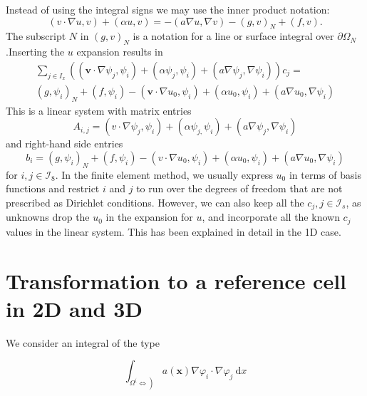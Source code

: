 \documentclass[../main.tex]{subfiles}
\begin{document}
	Instead of using the integral signs we may use the inner product notation:
	$$
	(v \cdot \nabla u, v)+(\alpha u, v)=-(a \nabla u, \nabla v)-(g, v)_{N}+(f, v) .
	$$
	The subscript $N$ in $(g, v)_{N}$ is a notation for a line or surface integral over $\partial \Omega_{N}$.\smallbreak Inserting the $u$ expansion results in
	$$
	\begin{aligned}
		\sum_{j \in I_{x}}\left(\left(\boldsymbol{v} \cdot \nabla \psi_{j}, \psi_{i}\right)+\left(\alpha \psi_{j}, \psi_{i}\right)+\left(a \nabla \psi_{j}, \nabla \psi_{i}\right)\right) c_{j}=\\
		\left(g, \psi_{i}\right)_{N}+\left(f, \psi_{i}\right)-\left(\boldsymbol{v} \cdot \nabla u_{0}, \psi_{i}\right)+\left(\alpha u_{0}, \psi_{i}\right)+\left(a \nabla u_{0}, \nabla \psi_{i}\right)
	\end{aligned}
	$$
	This is a linear system with matrix entries
	$$
	A_{i, j}=\left(v \cdot \nabla \psi_{j}, \psi_{i}\right)+\left(\alpha \psi_{j,} \psi_{i}\right)+\left(a \nabla \psi_{j}, \nabla \psi_{i}\right)
	$$
	and right-hand side entries
	$$
	b_{i}=\left(g, \psi_{i}\right)_{N}+\left(f, \psi_{i}\right)-\left(v \cdot \nabla u_{0}, \psi_{i}\right)+\left(\alpha u_{0}, \psi_{i}\right)+\left(a \nabla u_{0}, \nabla \psi_{i}\right)
	$$
	for $i, j \in \mathcal{I}_{8}$.\smallbreak
	In the finite element method, we usually express $u_{0}$ in terms of basis functions and restrict $i$ and $j$ to run over the degrees of freedom that are not prescribed as Dirichlet conditions. However, we can also keep all the $c_{j}, j \in \mathcal{I}_{s}$, as unknowns drop the $u_{0}$ in the expansion for $u$, and incorporate all the known $c_{j}$ values in the linear system. This has been explained in detail in the 1D case.\bigbreak 
	
	\section[Transformation to a reference cell in 2D and 3D]{Transformation to a reference cell in 2D and 3D}
		\label{sec:sec_17_1}
	 
		\noindent We consider an integral of the type
		
		\begin{equation}
			\label{eqa201}
			\int_{\left.\Omega^{(} \Leftrightarrow\right)} a(\boldsymbol{x}) \nabla \varphi_{i} \cdot \nabla \varphi_{j} \mathrm{~d} x
		\end{equation}
	
\end{document}
